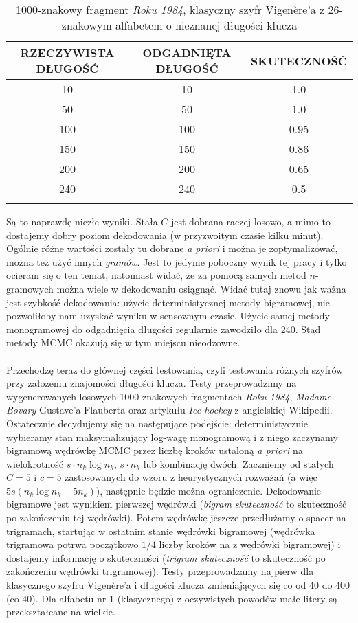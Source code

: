 \documentclass[a4paper]{article}
\theoremstyle{defn}
\theoremstyle{theorem}
\theoremstyle{lemma}
\theoremstyle{cor}
\theoremstyle{fact}
\begin{document}
\begin{center}\begin{longtable}{|c|c|c|}
\hline RZECZYWISTA DŁUGOŚĆ & ODGADNIĘTA DŁUGOŚĆ & SKUTECZNOŚĆ\\ \hline
10 & 10 & 1.0\\ \hline
50 & 50 & 1.0\\ \hline
100 & 100 & 0.95\\ \hline
150 & 150 & 0.86\\ \hline
200 & 200 & 0.65\\ \hline
240 & 240 & 0.5\\ \hline
\caption{1000-znakowy fragment \textit{Roku 1984}, klasyczny szyfr Vigenère'a z 26-znakowym alfabetem o nieznanej długości klucza}
\end{longtable}\end{center}
Są to naprawdę niezłe wyniki. Stała $C$ jest dobrana raczej losowo, a mimo to dostajemy dobry poziom dekodowania (w przyzwoitym czasie kilku minut). Ogólnie różne wartości zostały tu dobrane \textit{a priori} i można je zoptymalizować, można też użyć innych \textit{gramów}. Jest to jedynie poboczny wynik tej pracy i tylko ocieram się o ten temat, natomiast widać, że za pomocą samych metod $n$-gramowych można wiele w dekodowaniu osiągnąć. Widać tutaj znowu jak ważna jest szybkość dekodowania: użycie deterministycznej metody bigramowej, nie pozwoliłoby nam uzyskać wyniku w sensownym czasie. Użycie samej metody monogramowej do odgadnięcia długości regularnie zawodziło dla 240. Stąd metody MCMC okazują się w tym miejscu nieodzowne.
\\\\
Przechodzę teraz do głównej części testowania, czyli testowania różnych szyfrów przy założeniu znajomości długości klucza.
 Testy przeprowadzimy na wygenerowanych losowych 1000-znakowych fragmentach \textit{Roku 1984}, \textit{Madame Bovary}  Gustave'a Flauberta \cite{gutenberg} oraz artykułu \textit{Ice hockey} \cite{hockey} z angielskiej Wikipedii.
Ostatecznie decydujemy się na następujące podejście: deterministycznie wybieramy stan maksymalizujący log-wagę monogramową i z niego zaczynamy bigramową wędrówkę MCMC przez liczbę kroków ustaloną \textit{a priori} na wielokrotność $s \cdot n_k \log n_k$, $s \cdot n_k$ lub kombinację dwóch. Zaczniemy od stałych $C=5$  i $c=5$ zastosowanych do wzoru z heurystycznych rozważań (a więc $5s(n_k\log n_k + 5n_k)$), następnie będzie można ograniczenie. Dekodowanie bigramowe jest wynikiem pierwszej wędrówki (\textit{bigram skuteczność} to skuteczność po zakończeniu tej wędrówki). Potem wędrówkę jeszcze przedłużamy o spacer na trigramach, startując w ostatnim stanie wędrówki bigramowej (wędrówka trigramowa potrwa początkowo $1/4$ liczby kroków na z wędrówki bigramowej) i dostajemy informację o skuteczności (\textit{trigram skuteczność} to skuteczność po zakończeniu wędrówki trigramowej). Testy przeprowadzamy najpierw dla klasycznego szyfru Vigenère'a i długości klucza zmieniających się co od 40 do 400 (co 40). Dla alfabetu nr 1 (klasycznego) z oczywistych powodów małe litery są przekształcane na wielkie.\\
\end{document}
